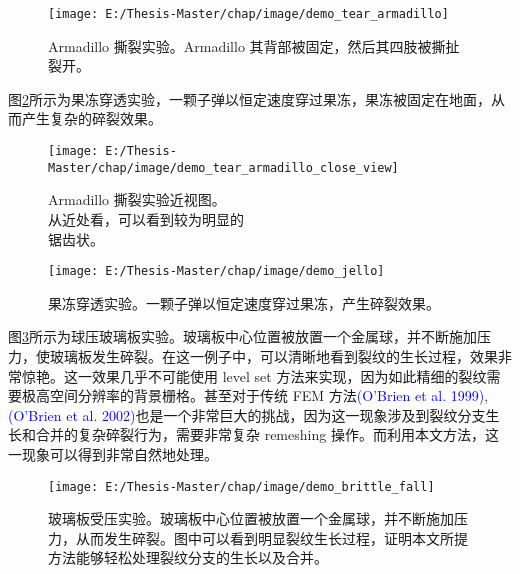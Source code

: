 \begin{figure}[!htb]
  \centering
  \captionsetup{justification=centering}
  \texttt{[image: E:/Thesis-Master/chap/image/demo\_tear\_armadillo]}

  \caption{\label{demo_tear_armadillo}
           Armadillo 撕裂实验。Armadillo 其背部被固定，然后其四肢被撕扯裂开。
          }
\end{figure}

图\ref{demo_jello}所示为果冻穿透实验，一颗子弹以恒定速度穿过果冻，果冻被固定在地面，从而产生复杂的碎裂效果。

\begin{figure}[htbp]
\centering
\begin{minipage}[t]{0.45\textwidth}
\flushleft

  \texttt{[image: E:/Thesis-Master/chap/image/demo\_tear\_armadillo\_close\_view]}
  \caption{\label{demo_tear_armadillo_close_view}
           Armadillo 撕裂实验近视图。\\从近处看，可以看到较为明显的\\锯齿状。
          }

\end{minipage}
\begin{minipage}[t]{0.45\textwidth}
\flushright

  \texttt{[image: E:/Thesis-Master/chap/image/demo\_jello]}
  \caption{\label{demo_jello}
           果冻穿透实验。一颗子弹以恒定速度穿过果冻，产生碎裂效果。
          }

\end{minipage}
\end{figure}

图\ref{demo_brittle_fall}所示为球压玻璃板实验。玻璃板中心位置被放置一个金属球，并不断施加压力，使玻璃板发生碎裂。在这一例子中，可以清晰地看到裂纹的生长过程，效果非常惊艳。这一效果几乎不可能使用 level set 方法来实现，因为如此精细的裂纹需要极高空间分辨率的背景栅格。甚至对于传统 FEM 方法\textcolor{blue}{(O'Brien et al. 1999)\parencite{OBrien1999}},\textcolor{blue}{(O'Brien et al. 2002)\parencite{OBrien2002}}也是一个非常巨大的挑战，因为这一现象涉及到裂纹分支生长和合并的复杂碎裂行为，需要非常复杂 remeshing 操作。而利用本文方法，这一现象可以得到非常自然地处理。

\begin{figure}[!htb]
  \centering
  \captionsetup{justification=centering}
  \texttt{[image: E:/Thesis-Master/chap/image/demo\_brittle\_fall]}

  \caption{\label{demo_brittle_fall}
           玻璃板受压实验。玻璃板中心位置被放置一个金属球，并不断施加压力，从而发生碎裂。图中可以看到明显裂纹生长过程，证明本文所提方法能够轻松处理裂纹分支的生长以及合并。
          }
\end{figure}

